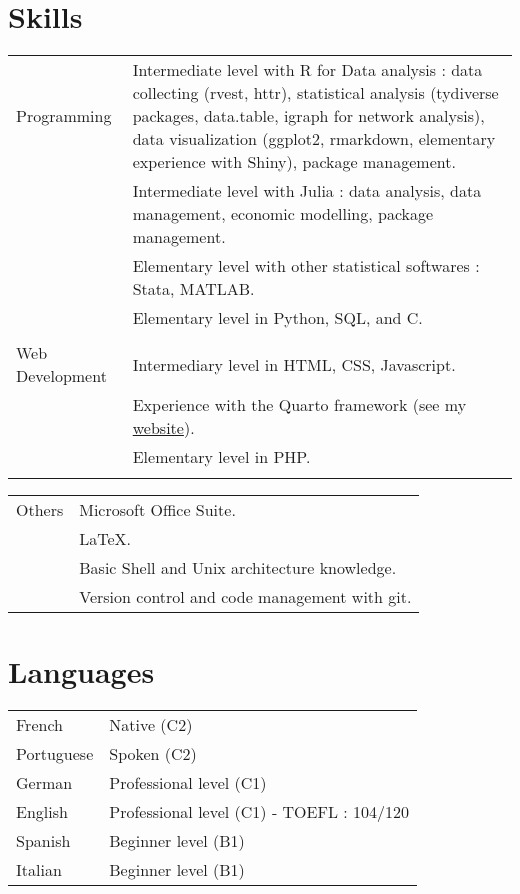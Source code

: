\documentclass[a4paper,12pt]{article}
\begin{document}
\section{Skills}
\begin{tabularx}{\linewidth}{@{}l X@{}}
Programming & Intermediate level with R for Data analysis : data collecting (rvest, httr), 
statistical analysis (tydiverse packages, data.table, igraph for network analysis), 
data visualization (ggplot2, rmarkdown, elementary experience with Shiny), package management. \\ 
& Intermediate level with Julia : data analysis, data management, economic modelling, package management. \\
& Elementary level with other statistical softwares : Stata, MATLAB. \\
& Elementary level in Python, SQL, and C. \\
& \\
Web Development  &  Intermediary level in HTML, CSS, Javascript. \\
& Experience with the Quarto framework (see my \href{https://www.paulogcd.com}{website}). \\
& Elementary level in PHP.\\
& \\
\end{tabularx}

\begin{tabularx}{\linewidth}{@{}l X@{}}
Others \quad \quad \quad \quad \quad \quad & Microsoft Office Suite. \\
&  \LaTeX. \\
& Basic Shell and Unix architecture knowledge. \\
& Version control and code management with git. \\
\end{tabularx}

\section{Languages}
\begin{tabularx}{\linewidth}{@{}l X@{}}
French &  \normalsize{Native (C2)}\\
Portuguese &  \normalsize{Spoken (C2)}\\
German &  \normalsize{Professional level (C1)}\\  
English &  \normalsize{Professional level (C1) - TOEFL : 104/120}\\ 
Spanish & \normalsize{Beginner level (B1)}\\ 
Italian & \normalsize{Beginner level (B1)}\\ 
\end{tabularx}

\vfill
{}
\end{document}
